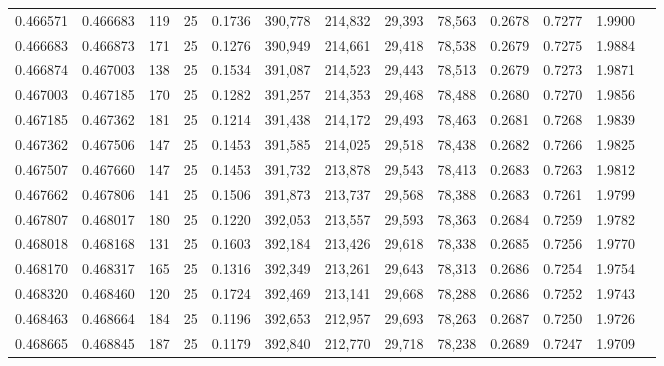 \begin{tabular}{rrrrrrrrrrrrr}
0.466571 & 0.466683 &   119 &  25 &                                     0.1736 & 390,778 & 214,832 &  29,393 &  78,563 & 0.2678 & 0.7277 & 1.9900 \\
0.466683 & 0.466873 &   171 &  25 &                                     0.1276 & 390,949 & 214,661 &  29,418 &  78,538 & 0.2679 & 0.7275 & 1.9884 \\
0.466874 & 0.467003 &   138 &  25 &                                     0.1534 & 391,087 & 214,523 &  29,443 &  78,513 & 0.2679 & 0.7273 & 1.9871 \\
0.467003 & 0.467185 &   170 &  25 &                                     0.1282 & 391,257 & 214,353 &  29,468 &  78,488 & 0.2680 & 0.7270 & 1.9856 \\
0.467185 & 0.467362 &   181 &  25 &                                     0.1214 & 391,438 & 214,172 &  29,493 &  78,463 & 0.2681 & 0.7268 & 1.9839 \\
0.467362 & 0.467506 &   147 &  25 &                                     0.1453 & 391,585 & 214,025 &  29,518 &  78,438 & 0.2682 & 0.7266 & 1.9825 \\
0.467507 & 0.467660 &   147 &  25 &                                     0.1453 & 391,732 & 213,878 &  29,543 &  78,413 & 0.2683 & 0.7263 & 1.9812 \\
0.467662 & 0.467806 &   141 &  25 &                                     0.1506 & 391,873 & 213,737 &  29,568 &  78,388 & 0.2683 & 0.7261 & 1.9799 \\
0.467807 & 0.468017 &   180 &  25 &                                     0.1220 & 392,053 & 213,557 &  29,593 &  78,363 & 0.2684 & 0.7259 & 1.9782 \\
0.468018 & 0.468168 &   131 &  25 &                                     0.1603 & 392,184 & 213,426 &  29,618 &  78,338 & 0.2685 & 0.7256 & 1.9770 \\
0.468170 & 0.468317 &   165 &  25 &                                     0.1316 & 392,349 & 213,261 &  29,643 &  78,313 & 0.2686 & 0.7254 & 1.9754 \\
0.468320 & 0.468460 &   120 &  25 &                                     0.1724 & 392,469 & 213,141 &  29,668 &  78,288 & 0.2686 & 0.7252 & 1.9743 \\
0.468463 & 0.468664 &   184 &  25 &                                     0.1196 & 392,653 & 212,957 &  29,693 &  78,263 & 0.2687 & 0.7250 & 1.9726 \\
0.468665 & 0.468845 &   187 &  25 &                                     0.1179 & 392,840 & 212,770 &  29,718 &  78,238 & 0.2689 & 0.7247 & 1.9709 \\

\end{tabular}

